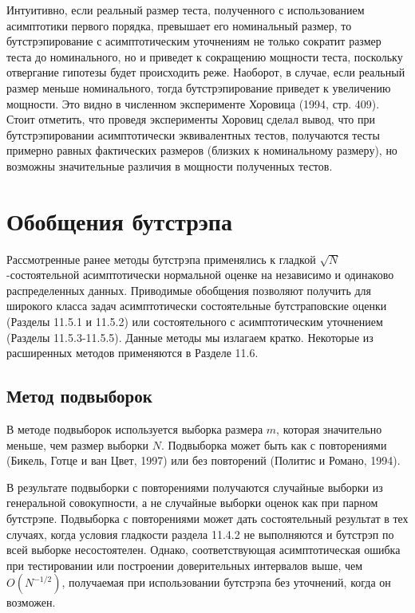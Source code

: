 Интуитивно, если реальный размер теста, полученного с использованием асимптотики первого порядка, превышает его номинальный размер, то бутстрэпирование с асимптотическим уточнениям не только  сократит размер теста до номинального, но и приведет к сокращению мощности теста, поскольку отвергание гипотезы будет  происходить реже. Наоборот, в случае, если реальный размер меньше номинального, тогда бутстрэпирование приведет к увеличению мощности. Это видно в численном эксперименте Хоровица (1994, стр. 409). Стоит отметить, что проведя эксперименты Хоровиц сделал вывод, что при  бутстрэпировании асимптотически эквивалентных тестов, получаются тесты примерно равных фактических размеров  (близких к номинальному размеру), но возможны значительные различия в мощности полученных тестов. 


\section{Обобщения бутстрэпа}

Рассмотренные ранее методы бутстрэпа применялись к гладкой $\sqrt{N}$-состоятельной асимптотически нормальной оценке на независимо и одинаково распределенных данных. Приводимые обобщения позволяют получить для широкого класса задач асимптотически состоятельные бутстраповские оценки (Разделы 11.5.1 и 11.5.2) или состоятельного с асимптотическим уточнением (Разделы 11.5.3-11.5.5). Данные методы мы излагаем кратко. Некоторые из расширенных методов применяются в Разделе 11.6.

\subsection{Метод подвыборок}

В методе подвыборок используется выборка размера $m$, которая значительно меньше, чем размер выборки $N$. Подвыборка может быть как с повторениями (Бикель, Готце и ван Цвет, 1997) или без повторений (Политис и Романо, 1994).

В результате подвыборки с повторениями получаются случайные выборки из  генеральной совокупности, а не случайные выборки оценок как  при парном бутстрэпе. Подвыборка с повторениями может дать состоятельный результат в тех случаях, когда условия гладкости раздела 11.4.2 не выполняются и  бутстрэп по всей выборке несостоятелен. Однако, соответствующая асимптотическая ошибка при тестировании или построении  доверительных интервалов выше, чем $O(N^{-1/2})$, получаемая при использовании бутстрэпа без уточнений, когда он возможен.

